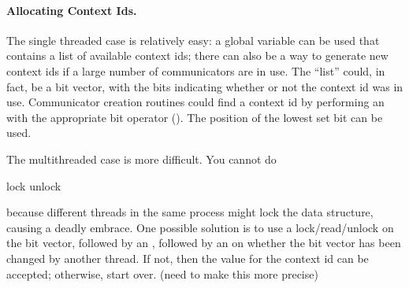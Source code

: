 \documentclass{article}
\begin{document}
\paragraph{Allocating Context Ids.}
The single threaded case is relatively easy: a global variable can be used
that contains a list of available context ids; there can also be a way to
generate new context ids if a large number of communicators are in use.  The
``list'' could, in fact, be a bit vector, with the bits indicating whether or
not the context id was in use.  Communicator creation routines could find a
context id by performing an  with the appropriate bit
operator ().  The position of the lowest set bit can be
used.  

The multithreaded case is more difficult.  You cannot do
\begin{algorithm}
  lock
  unlock
\end{algorithm}
because different threads in the same process might lock the data structure,
causing a deadly embrace.
One possible solution is to use a lock/read/unlock on the bit vector, followed
by an , followed by an  on
whether the bit vector has been changed by another thread.  If not, then the
value for the context id can be accepted; otherwise, start over.  (need to
make this more precise)
\end{document}

